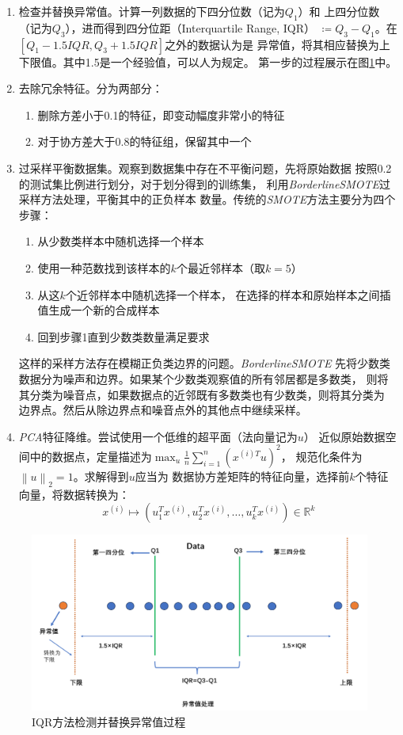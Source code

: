 \begin{enumerate}
    \item 检查并替换异常值。计算一列数据的下四分位数（记为$Q_1$）和
    上四分位数（记为$Q_3$），进而得到四分位距（Interquartile Range, IQR）
    $\coloneqq Q_3-Q_1$。在$[Q_1-1.5IQR, Q_3+1.5IQR]$之外的数据认为是
    异常值，将其相应替换为上下限值。其中1.5是一个经验值，可以人为规定。
    第一步的过程展示在图\ref{fig:IQR-outlier-detection}中。
    \item 去除冗余特征。分为两部分：
    \begin{enumerate}
        \item 删除方差小于0.1的特征，即变动幅度非常小的特征
        \item 对于协方差大于0.8的特征组，保留其中一个
    \end{enumerate}
    \item 过采样平衡数据集。观察到数据集中存在不平衡问题，先将原始数据
    按照0.2的测试集比例进行划分，对于划分得到的训练集，
    利用\textit{BorderlineSMOTE}过采样方法处理，平衡其中的正负样本
    数量。传统的\textit{SMOTE}方法主要分为四个步骤：
    \begin{enumerate}
        \item 从少数类样本中随机选择一个样本
        \item 使用一种范数找到该样本的$k$个最近邻样本（取$k=5$）
        \item 从这$k$个近邻样本中随机选择一个样本，
        在选择的样本和原始样本之间插值生成一个新的合成样本
        \item 回到步骤1直到少数类数量满足要求
    \end{enumerate}
    这样的采样方法存在模糊正负类边界的问题。\textit{BorderlineSMOTE}
    先将少数类数据分为噪声和边界。如果某个少数类观察值的所有邻居都是多数类，
    则将其分类为噪音点，如果数据点的近邻既有多数类也有少数类，则将其分类为
    边界点。然后从除边界点和噪音点外的其他点中继续采样。
    \item \textit{PCA}特征降维。尝试使用一个低维的超平面（法向量记为$u$）
    近似原始数据空间中的数据点，定量描述为$\max_u \frac{1}{n}\sum_{i=1}^{n}(x^{(i)T}u)^2$，
    规范化条件为$\left\lVert u\right\rVert _2 =1$。求解得到$u$应当为
    数据协方差矩阵的特征向量，选择前$k$个特征向量，将数据转换为：
    \begin{equation*}
    x^{(i)} \mapsto (u_1^T x^{(i)},u_2^T x^{(i)},\ldots,u_k^T x^{(i)})\in
    \mathbb{R}^k
    \end{equation*}
\end{enumerate}
\begin{figure}[ht]
    \centering
    \includegraphics[width=.6\textwidth]{images/IQR_outlier_selection.png}
    \caption{IQR方法检测并替换异常值过程}
    \label{fig:IQR-outlier-detection}
\end{figure}

